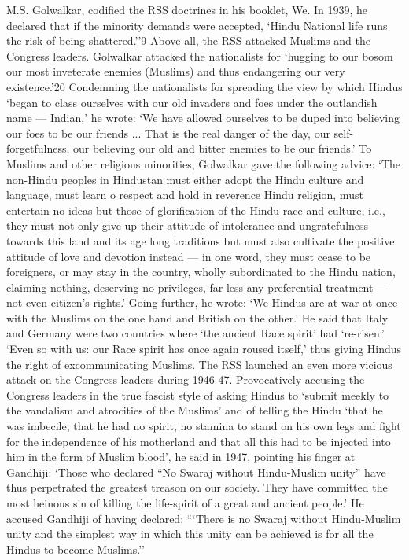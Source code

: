 M.S. Golwalkar, codified the RSS doctrines in his booklet, We. In 1939, he declared that if the minority demands were accepted, `Hindu National life runs the risk of being shattered.''9 Above all, the RSS attacked Muslims and the Congress leaders. Golwalkar attacked the nationalists for `hugging to our bosom our most inveterate enemies (Muslims) and thus endangering our very existence.'20 Condemning the nationalists for spreading the view by which Hindus `began to class ourselves with our old invaders and foes under the outlandish name — Indian,' he wrote: `We have allowed ourselves to be duped into believing our foes to be our friends ... That is the real danger of the day, our self- forgetfulness, our believing our old and bitter enemies to be our friends.' To Muslims and other religious minorities, Golwalkar gave the following advice: `The non-Hindu peoples in Hindustan must either adopt the Hindu culture and language, must learn o respect and hold in reverence Hindu religion, must entertain no ideas but those of glorification of the Hindu race and culture, i.e., they must not only give up their attitude of intolerance and ungratefulness towards this land and its age long traditions but must also cultivate the positive attitude of love and devotion instead — in one word, they must cease to be foreigners, or may stay in the country, wholly subordinated to the Hindu nation, claiming nothing, deserving no privileges, far less any preferential treatment — not even citizen's rights.' Going further, he wrote: `We Hindus are at war at once with the Muslims on the one hand and British on the other.' He said that Italy and Germany were two countries where `the ancient Race spirit' had `re-risen.' `Even so with us: our Race spirit has once again roused itself,' thus giving Hindus the right of excommunicating Muslims. The RSS launched an even more vicious attack on the Congress leaders during 1946-47. Provocatively accusing the Congress leaders in the true fascist style of asking Hindus to `submit meekly to the vandalism and atrocities of the Muslims' and of telling the Hindu `that he was imbecile, that he had no spirit, no stamina to stand on his own legs and fight for the independence of his motherland and that all this had to be injected into him in the form of Muslim blood', he said in 1947, pointing his finger at Gandhiji: `Those who declared ``No Swaraj without Hindu-Muslim unity'' have thus perpetrated the greatest treason on our society. They have committed the most heinous sin of killing the life-spirit of a great and ancient people.' He accused Gandhiji of having declared: ```There is no Swaraj without Hindu-Muslim unity and the simplest way in which this unity can be achieved is for all the Hindus to become Muslims.'' 

